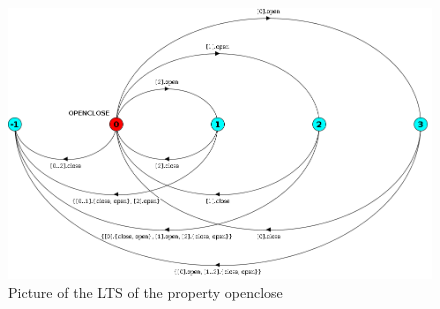\begin{figure}[!h]
  \centering
    \includegraphics[width=\textwidth]{openclose_lts.png}
    \caption{Picture of the LTS of the property openclose}
\end{figure}
